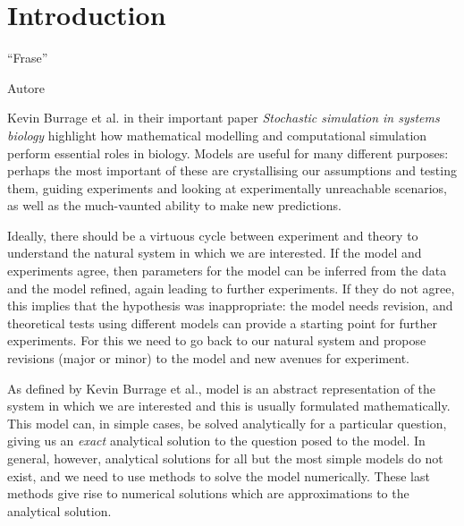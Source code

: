 \documentclass[12pt,a4paper]{report}
\begin{document}
\pagestyle{fancy}
\makeatletter%
\renewcommand{\chaptermark}[1]{%
  \markboth{\@chapapp \thechapter\ --\ #1}{\@chapapp \thechapter\ -- \ #1}%
}
\makeatother%
\fancyhead[R]{}
\fancyhead[L]{\leftmark}%

\chapter{Introduction}\epigraph{``Frase''}{Autore}



Kevin Burrage et al. in their important paper \emph{Stochastic simulation in systems biology} \cite{Article} highlight how mathematical modelling and computational simulation perform essential roles in biology. Models are useful for many different purposes: perhaps the most important of these are crystallising our assumptions and testing them, guiding experiments and looking at experimentally unreachable scenarios, as well as the much-vaunted ability to make new predictions. 

Ideally, there should be a virtuous cycle between experiment and theory to understand the natural system in which we are interested. If the model and experiments agree, then parameters for the model can be inferred from the data and the model refined, again leading to further experiments.  If they do not agree, this implies that the hypothesis was inappropriate: the model needs revision, and theoretical tests using different models can provide a starting point for further experiments. For this we need to go back to our natural system and propose revisions (major or minor) to the model and new avenues for experiment.

As defined by Kevin Burrage et al., model is an abstract representation of the system in which we are interested and this is usually formulated mathematically. This model can, in simple cases, be solved analytically for a particular question, giving us an \emph{exact} analytical solution to the question posed to the model. In general, however, analytical solutions for all but the most simple models do not exist, and we need to use methods to solve the model numerically. These last methods give rise to numerical solutions which are approximations to the analytical solution.%
\end{document}
